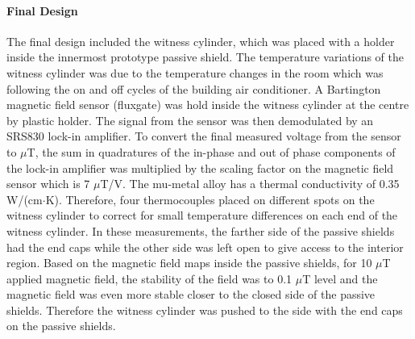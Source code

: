 \documentclass[review]{elsarticle}
\begin{document}
\paragraph{Final Design} 

The final design included the witness cylinder, which was placed with
a holder inside the innermost prototype passive shield. The
temperature variations of the witness cylinder was due to the
temperature changes in the room which was following the on and off
cycles of the building air conditioner. A Bartington magnetic field
sensor (fluxgate) was hold inside the witness cylinder at the centre
by plastic holder. The signal from the sensor was then demodulated by
an SRS830 lock-in amplifier. To convert the final measured voltage
from the sensor to $\mu$T, the sum in quadratures of the in-phase and
out of phase components of the lock-in amplifier was multiplied by the
scaling factor on the magnetic field sensor which is 7 $\mu$T/V.  The
mu-metal alloy has a thermal conductivity of 0.35
W/(cm$\cdot$K). Therefore, four thermocouples placed on different
spots on the witness cylinder to correct for small temperature
differences on each end of the witness cylinder.  In these
measurements, the farther side of the passive shields had the end caps
while the other side was left open to give access to the interior
region. Based on the magnetic field maps inside the passive shields,
for 10 $\mu$T applied magnetic field, the stability of the field was
to 0.1 $\mu$T level and the magnetic field was even more stable closer
to the closed side of the passive shields. Therefore the witness
cylinder was pushed to the side with the end caps on the passive
shields.




%
%
\end{document}
